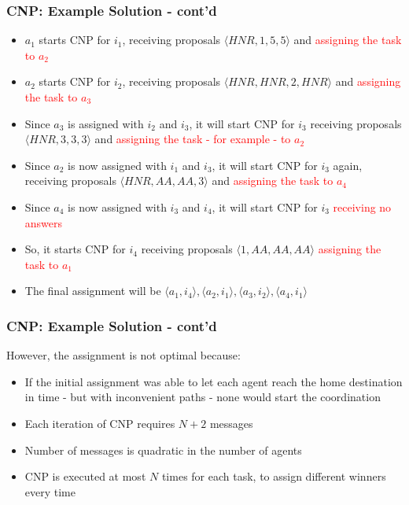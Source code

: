 \begin{frame}
	\frametitle{CNP: Example Solution - cont'd}
	
	\begin{itemize}
		\item $ a_1 $ starts CNP for $ i_1 $, receiving proposals $ \langle HNR,1,5,5
			  \rangle $ and \textcolor{red}{assigning the task to $ a_2 $}
		
		\item $ a_2 $ starts CNP for $ i_2 $, receiving proposals $ \langle HNR,HNR,2,HNR
			  \rangle $ and \textcolor{red}{assigning the task to $ a_3 $}
		
		\item Since $ a_3 $ is assigned with $ i_2 $ and $ i_3 $, it will start CNP for $
			  i_3 $ receiving proposals $ \langle HNR,3,3,3 \rangle $ and \textcolor{red}
			  {assigning the task - for example - to $ a_2 $}
		
		\item Since $ a_2 $ is now assigned with $ i_1 $ and $ i_3 $, it will start CNP for
			  $ i_3 $ again, receiving proposals $ \langle HNR,AA,AA,3 \rangle $ and
			  \textcolor{red}{assigning the task to $ a_4 $}
		
		\item Since $ a_4 $ is now assigned with $ i_3 $ and $ i_4 $, it will start CNP for
			  $ i_3 $ \textcolor{red}{receiving no answers}
		
		\item So, it starts CNP for $ i_4 $ receiving proposals $ \langle 1,AA,AA,AA
			  \rangle $ \textcolor{red}{assigning the task to $ a_1 $}
		
		\item The final assignment will be $ \langle a_1,i_4 \rangle, \langle a_2,i_1
			  \rangle, \langle a_3,i_2 \rangle, \langle a_4,i_1 \rangle$
	\end{itemize}
\end{frame}

\begin{frame}
	\frametitle{CNP: Example Solution - cont'd}
	
	\Large
	
	\vspace{0.2cm}
	
	However, the assignment is not optimal because:
	
	\begin{itemize}
		\item If the initial assignment was able to let each agent reach the home
			  destination in time - but with inconvenient paths - none would start the
			  coordination
		
		\item Each iteration of CNP requires $ N + 2 $ messages
		
		\item Number of messages is quadratic in the number of agents
		
		\item CNP is executed at most $ N $ times for each task, to assign different
			  winners every time
	\end{itemize}
\end{frame}

